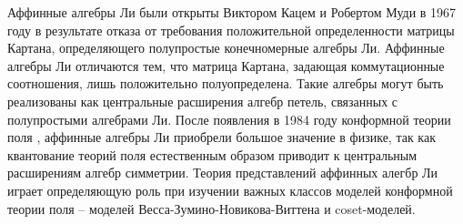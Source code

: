 \intro

%
%



Аффинные алгебры Ли были открыты Виктором Кацем \cite{kac1968simple} и Робертом Муди \cite{moody1968new} в 1967 году в результате отказа от требования положительной определенности матрицы Картана, определяющего полупростые конечномерные алгебры Ли. Аффинные алгебры Ли отличаются тем, что матрица Картана, задающая коммутационные соотношения, лишь положительно полуопределена. Такие алгебры могут быть реализованы как центральные расширения алгебр петель, связанных с полупростыми алгебрами Ли.  После появления в 1984 году конформной теории поля \cite{belavin1984ics}, аффинные алгебры Ли приобрели большое значение в физике, так как квантование теорий поля естественным образом приводит к центральным расширениям алгебр симметрии. Теория представлений аффинных алегбр Ли играет определяющую роль при изучении важных классов моделей конформной теории поля -- моделей Весса-Зумино-Новикова-Виттена и coset-моделей. 









\resultssection
\resultstext

\approbationsection
\approbationtext

\pubsection
\pubtext


\structsection
\structtext
